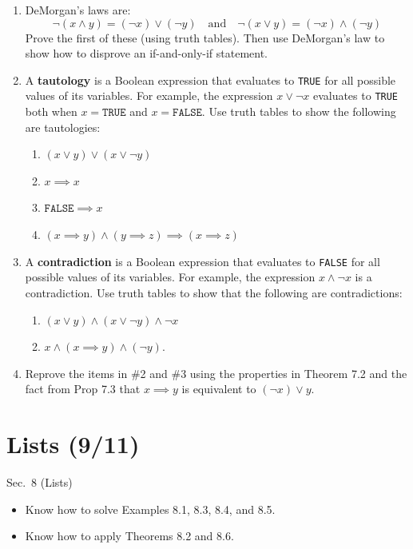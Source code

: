 \documentclass[11pt]{article}
\begin{document}
\begin{enumerate}
\item DeMorgan's laws are:
\[ \lnot (x \land y) = (\lnot x) \lor (\lnot y) \quad \text{and} \quad \lnot (x \lor y) = (\lnot x) \land (\lnot y) \]
Prove the first of these (using truth tables). Then use DeMorgan's law to show how to disprove an if-and-only-if statement.
\item A \textbf{tautology} is a Boolean expression that evaluates to \texttt{TRUE} for all possible values of its variables. For example, the expression $x \lor \lnot x$ evaluates to \texttt{TRUE} both when $x=\texttt{TRUE}$ and $x=\texttt{FALSE}$. Use truth tables to show the following are tautologies:
\begin{enumerate}
\item $(x \lor y) \lor (x \lor \lnot y)$
\item $x \implies x$
\item $\texttt{FALSE} \implies x$
\item $(x \implies y) \land (y \implies z) \implies (x \implies z)$
\end{enumerate}
\item A \textbf{contradiction} is a Boolean expression that evaluates to \texttt{FALSE} for all possible values of its variables. For example, the expression $x \land \lnot x$ is a contradiction. Use truth tables to show that the following are contradictions:
\begin{enumerate}
\item $(x \lor y) \land (x \lor \lnot y) \land \lnot x$
\item $x \land (x \implies y) \land (\lnot y)$.
\end{enumerate}
\item Reprove the items in \#2 and \#3 using the properties in Theorem 7.2 and the fact from Prop 7.3 that $x \implies y$ is equivalent to $(\lnot x) \lor y$.
\end{enumerate}

\section*{Lists (9/11)}
\begin{textbook}{Sec.~8 (Lists)}
\begin{itemize}[leftmargin=*, nosep]
\item Know how to solve Examples 8.1, 8.3, 8.4, and 8.5.
\item Know how to apply Theorems 8.2 and 8.6.
\end{itemize}
\end{textbook}
\end{document}
